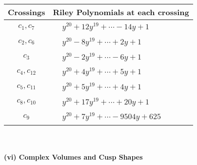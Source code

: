 \documentclass[1p]{elsarticle_modified}
\theoremstyle{definition}
\begin{document}
\begin{tabular}{m{50pt}|m{274pt}}
Crossings & \hspace{64pt}Riley Polynomials at each crossing \\
\hline $$\begin{aligned}c_{1},c_{7}\end{aligned}$$&$\begin{aligned}
&y^{20}+12 y^{19}+\cdots-14 y+1
\end{aligned}$\\
\hline $$\begin{aligned}c_{2},c_{6}\end{aligned}$$&$\begin{aligned}
&y^{20}-8 y^{19}+\cdots+2 y+1
\end{aligned}$\\
\hline $$\begin{aligned}c_{3}\end{aligned}$$&$\begin{aligned}
&y^{20}-2 y^{19}+\cdots-6 y+1
\end{aligned}$\\
\hline $$\begin{aligned}c_{4},c_{12}\end{aligned}$$&$\begin{aligned}
&y^{20}+4 y^{19}+\cdots+5 y+1
\end{aligned}$\\
\hline $$\begin{aligned}c_{5},c_{11}\end{aligned}$$&$\begin{aligned}
&y^{20}+5 y^{19}+\cdots+4 y+1
\end{aligned}$\\
\hline $$\begin{aligned}c_{8},c_{10}\end{aligned}$$&$\begin{aligned}
&y^{20}+17 y^{19}+\cdots+20 y+1
\end{aligned}$\\
\hline $$\begin{aligned}c_{9}\end{aligned}$$&$\begin{aligned}
&y^{20}+7 y^{19}+\cdots-9504 y+625
\end{aligned}$\\
\hline
\end{tabular}\\~\\
\newpage\flushleft \textbf{(vi) Complex Volumes and Cusp Shapes}
\end{document}
